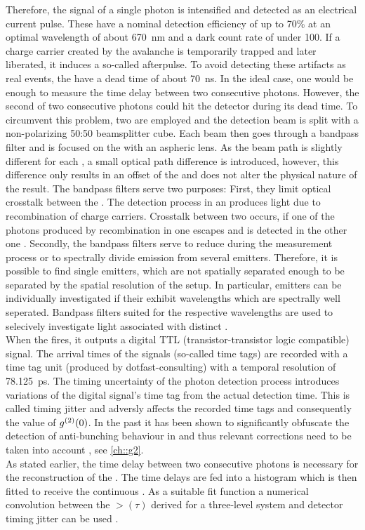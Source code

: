 		Therefore, the signal of a single photon is intensified and detected as an electrical current pulse.
		These \apds have a nominal detection efficiency of up to 70\% at an optimal wavelength of about \SI{670}{\nm} and a dark count rate of under \SI{100}{\cps}.
		If a charge carrier created by the avalanche is temporarily trapped and later liberated, it induces a so-called afterpulse.
		To avoid detecting these artifacts as real events, the \APDs have a dead time of about \SI{70}{\ns}.
		In the ideal case, one \APD would be enough to measure the time delay between two consecutive photons.
		However, the second of two consecutive photons could hit the detector during its dead time.
		To circumvent this problem, two \APDs are employed and the detection beam is split with a non-polarizing 50:50 beamsplitter cube.
		Each beam then goes through a bandpass filter and is focused on the \apd with an aspheric lens.
		As the beam path is slightly different for each \APD, a small optical path difference is introduced, however, this difference only results in an offset of the \gtf and does not alter the physical nature of the result.
		The bandpass filters serve two purposes:
		First, they limit optical crosstalk between the \apds.
		The detection process in an \apd produces light due to recombination of charge carriers.
		Crosstalk between two \apds occurs, if one of the photons produced by recombination in one \apd escapes and is detected in the other one \cite{Younger2009}.
		Secondly, the bandpass filters serve to reduce \bkg during the \gt measurement process or to spectrally divide emission from several emitters.
		Therefore, it is possible to find single emitters, which are not spatially separated enough to be separated by the spatial resolution of the setup.
		In particular, emitters can be individually investigated if their \ZPLs exhibit wavelengths which are spectrally well seperated.
		Bandpass filters suited for the respective wavelengths are used to selecively investigate light associated with distinct \ZPLs.
		\\
		When the \APD fires, it outputs a digital TTL (transistor-transistor logic compatible) signal.
		The arrival times of the signals (so-called time tags) are recorded with a time tag unit (produced by dotfast-consulting) with a temporal resolution of \SI{78.125}{\pico\second}.
		The timing uncertainty of the photon detection process introduces variations of the digital signal's time tag from the actual detection time.
		This is called timing jitter and adversly affects the recorded time tags and consequently the value of $g^{(2)}(0)$. In the past it has been shown to significantly obfuscate the detection of anti-bunching behaviour in \sps and thus relevant corrections need to be taken into account \cite{neu::thesis, janine::thesis}, see \autoref{ch::g2}.
		\\
		As stated earlier, the time delay between two consecutive photons is necessary for the reconstruction of the \gtf.
		The time delays are fed into a histogram which is then fitted to receive the continuous \gtf.
		As a suitable fit function a numerical convolution between the $\gt(\tau)$ derived for a three-level system and detector timing jitter can be used \cite{becker::16, neu::thesis, janine::thesis}.

